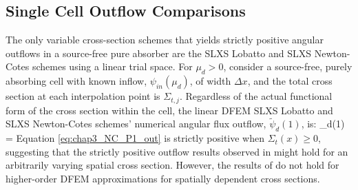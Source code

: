 \subsection{Single Cell Outflow Comparisons}

The only variable cross-section schemes that yields strictly positive angular outflows in a source-free pure absorber are the SLXS Lobatto and SLXS Newton-Cotes schemes using a linear trial space.
For $\mu_d > 0$, consider a source-free, purely absorbing cell with known inflow, $\psi_{in}(\mu_d)$, of width $\Delta x$, and the total cross section at each interpolation point is $\Sigma_{t,j}$.
Regardless of the actual functional form of the cross section within the cell, the linear DFEM SLXS Lobatto and SLXS Newton-Cotes schemes'
numerical angular flux outflow, $\widetilde{\psi}_d(1)$, is:
\benum
\label{eq:chap3_NC_P1_out}
\widetilde{\psi}_d(1) =  \pep
\eenum
Equation \ref{eq:chap3_NC_P1_out} is strictly positive when $\Sigma_t(x) \geq 0$, suggesting that the strictly positive outflow results observed in \cite{part_1_paper} might hold for an arbitrarily varying spatial cross section.
However, the results of \cite{part_1_paper} do not hold for higher-order DFEM approximations for spatially dependent cross sections.  

